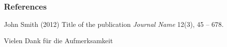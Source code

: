 \documentclass{beamer}
\begin{document}

\begin{frame}
\frametitle{References}
\footnotesize{
\begin{thebibliography}{99} %
 John Smith (2012)
\newblock Title of the publication
\newblock \emph{Journal Name} 12(3), 45 -- 678.
\end{thebibliography}
}
\end{frame}


\begin{frame}
\Huge{\centerline{Vielen Dank f\"{u}r die Aufmerksamkeit}}
\end{frame}

\end{document}
